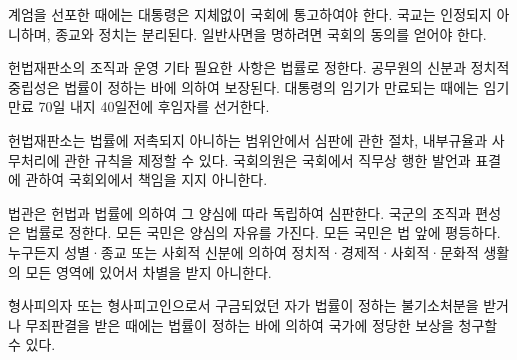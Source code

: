 
계엄을 선포한 때에는 대통령은 지체없이 국회에 통고하여야 한다. 국교는 인정되지 아니하며, 종교와 정치는 분리된다. 일반사면을 명하려면 국회의 동의를 얻어야 한다.

헌법재판소의 조직과 운영 기타 필요한 사항은 법률로 정한다. 공무원의 신분과 정치적 중립성은 법률이 정하는 바에 의하여 보장된다. 대통령의 임기가 만료되는 때에는 임기만료 70일 내지 40일전에 후임자를 선거한다.

헌법재판소는 법률에 저촉되지 아니하는 범위안에서 심판에 관한 절차, 내부규율과 사무처리에 관한 규칙을 제정할 수 있다. 국회의원은 국회에서 직무상 행한 발언과 표결에 관하여 국회외에서 책임을 지지 아니한다.

법관은 헌법과 법률에 의하여 그 양심에 따라 독립하여 심판한다. 국군의 조직과 편성은 법률로 정한다. 모든 국민은 양심의 자유를 가진다. 모든 국민은 법 앞에 평등하다. 누구든지 성별·종교 또는 사회적 신분에 의하여 정치적·경제적·사회적·문화적 생활의 모든 영역에 있어서 차별을 받지 아니한다.

형사피의자 또는 형사피고인으로서 구금되었던 자가 법률이 정하는 불기소처분을 받거나 무죄판결을 받은 때에는 법률이 정하는 바에 의하여 국가에 정당한 보상을 청구할 수 있다.